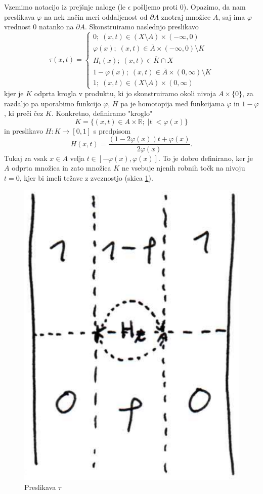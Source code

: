 \documentclass[a4paper, 12pt]{article}
\newcommand{\R}{\mathbb{R}}
\newcommand{\closure}[1]{\overline{#1}}
\begin{document}
\begin{enumerate}[label=(\alph*)]
	Vzemimo notacijo iz prejšnje naloge (le $\epsilon$ pošljemo proti $0$). Opazimo, da nam preslikava $\varphi$ na nek način meri oddaljenost od $\partial A$ znotraj množice $A$, saj ima $\varphi$ vrednost $0$ natanko na $\partial A$. Skonstruiramo naslednjo preslikavo 
	\[
	\tau(x, t) = \begin{cases}
	0 ; \; (x, t) \in (X \setminus A) \times (-\infty, 0) \\
	\varphi(x) ; \; (x, t) \in \closure{A} \times (-\infty, 0) \setminus K\\
	H_t(x) ; \; (x, t) \in \closure{K} \cap X\\
	1 - \varphi(x) ; \; (x, t) \in \closure{A} \times (0, \infty) \setminus K\\
	1 ; \; (x, t) \in (X \setminus A) \times (0, \infty)
	\end{cases}
	\]
	kjer je $K$ odprta krogla v produktu, ki jo skonstruiramo okoli nivoja $A\times\lbrace 0 \rbrace$, za razdaljo pa uporabimo funkcijo $\varphi$, $H$ pa je homotopija med funkcijama $\varphi$ in $1 - \varphi$, ki preči čez $K$.
	Konkretno, definiramo "kroglo"
	\[
	K = \lbrace (x, t) \in A\times \R ; \; |t| < \varphi(x) \rbrace
	\]
	in preslikavo $H \colon K \to [0, 1]$ s predpisom
	\[
	H(x, t) = \frac{(1 - 2\varphi(x))t + \varphi(x)}{2\varphi(x)}.
	\]
	Tukaj za vsak $x \in A$ velja $t \in [-\varphi(x), \varphi(x)]$.
	To je dobro definirano, ker je $A$ odprta množica in zato množica $K$ ne vsebuje njenih robnih točk na nivoju $t = 0$, kjer bi imeli težave z zveznostjo (skica \ref{fig:tau3f}).
	
	\begin{figure}[h]
		\centering
		\includegraphics[scale=0.3]{preslikava3f.png}
		\caption{Preslikava $\tau$}
		\label{fig:tau3f}
	\end{figure}
	

\end{enumerate}
\end{document}
